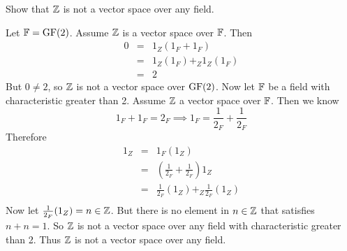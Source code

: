 \begin{ProbBox}  
\newcommand{\F}{\fld{F}}
\begin{problem}[Golan 70]
Show that $\mathbb{Z}$ is not a vector space over any field.
\end{problem}
\smallskip
\begin{solution}
Let $\mathbb{F} = \operatorname{GF}(2)$. Assume $\mathbb{Z}$ is a vector space over $\F$. Then
\begin{eqnarray*}
0 & = & 1_Z(1_F + 1_F) \\
  & = & 1_Z(1_{F})+_Z 1_Z(1_F) \\
  & = & 2 
\end{eqnarray*}
But $0 \neq 2$, so $\mathbb{Z}$ is not a vector space over $\operatorname{GF}(2)$. Now let $\F$ be a field with characteristic greater than 2. Assume $\mathbb{Z}$ a vector space over $\F$. Then we know
$$ 1_F + 1_F = 2_F \implies 1_F = \frac{1}{2_F} + \frac{1}{2_F}$$
Therefore
\begin{eqnarray*}
1_Z & = & 1_F(1_Z) \\
	& = & (\frac{1}{2_F} + \frac{1}{2_F})1_Z \\
	& = & \frac{1}{2_F}(1_Z) +_Z \frac{1}{2_F}(1_Z) \\
\end{eqnarray*}
Now let $\frac{1}{2_F}(1_Z) = n \in \mathbb{Z}$.  But there is no element in $n \in \mathbb{Z}$ that satisfies $n + n = 1$. So $\mathbb{Z}$ is not a vector space over any field with characteristic greater than 2. Thus $\mathbb{Z}$ is not a vector space over any field. 
\end{solution}
\probskip
\end{ProbBox}


